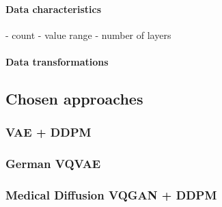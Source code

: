 \paragraph{Data characteristics}
- count
- value range
- number of layers
\paragraph{Data transformations}

\newpage
\subsection{Chosen approaches}
\subsubsection{VAE + DDPM}


\newpage
\subsubsection{German VQVAE}

\newpage
\subsubsection{Medical Diffusion VQGAN + DDPM}



% 